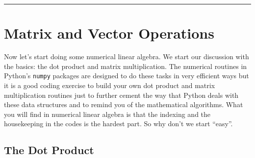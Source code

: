 \documentclass[
]{book}
\theoremstyle{definition}
\theoremstyle{definition}
\theoremstyle{definition}
\theoremstyle{remark}
\begin{document}
\begin{center}\rule{0.5\linewidth}{0.5pt}\end{center}

\hypertarget{matrix-and-vector-operations}{%
\section{Matrix and Vector Operations}\label{matrix-and-vector-operations}}

Now let's start doing some numerical linear algebra. We start our discussion with the basics: the dot product and matrix multiplication. The numerical routines in Python's \texttt{numpy} packages are designed to do these tasks in very efficient ways but it is a good coding exercise to build your own dot product and matrix multiplication routines just to further cement the way that Python deals with these data structures and to remind you of the mathematical algorithms. What you will find in numerical linear algebra is that the indexing and the housekeeping in the codes is the hardest part. So why don't we start ``easy''.

\hypertarget{the-dot-product}{%
\subsection{The Dot Product}\label{the-dot-product}}
\end{document}
